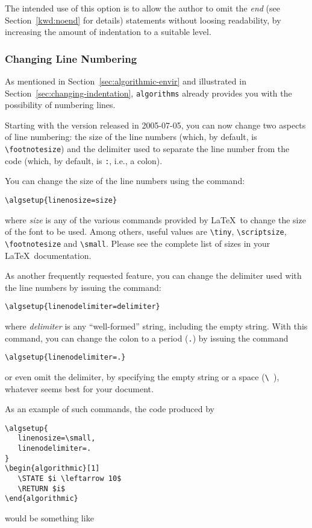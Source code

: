 \documentclass[letterpaper]{article}
\newcommand{\keyword}[1]{\texttt{#1}}
\begin{document}
The intended use of this option is to allow the author to omit the
\emph{end} (see Section~\ref{kwd:noend} for details) statements without
loosing readability, by increasing the amount of indentation to a
suitable level.

\subsubsection{Changing Line Numbering}

As mentioned in Section~\ref{sec:algorithmic-envir} and illustrated in
Section~\ref{sec:changing-indentation}, \keyword{algorithms} already
provides you with the possibility of numbering lines.

Starting with the version released in 2005-07-05, you can now change two
aspects of line numbering: the size of the line numbers (which, by
default, is \verb+\footnotesize+) and the delimiter used to separate the
line number from the code (which, by default, is \verb+:+, i.e., a
colon).

You can change the size of the line numbers using the command:
\begin{verbatim}
\algsetup{linenosize=size}
\end{verbatim}
where \emph{size} is any of the various commands provided by \LaTeX\ to
change the size of the font to be used. Among others, useful values are
\verb+\tiny+, \verb+\scriptsize+, \verb+\footnotesize+ and
\verb+\small+.  Please see the complete list of sizes in your \LaTeX\
documentation.

As another frequently requested feature, you can change the delimiter
used with the line numbers by issuing the command:
\begin{verbatim}
\algsetup{linenodelimiter=delimiter}
\end{verbatim}
where \emph{delimiter} is any ``well-formed'' string, including the
empty string. With this command, you can change the colon to a period
(\verb+.+) by issuing the command
\begin{verbatim}
\algsetup{linenodelimiter=.}
\end{verbatim}
or even omit the delimiter, by specifying the empty string or a space
(\verb+\ +), whatever seems best for your document.

As an example of such commands, the code produced by
\begin{verbatim}
\algsetup{
   linenosize=\small,
   linenodelimiter=.
}
\begin{algorithmic}[1]
   \STATE $i \leftarrow 10$
   \RETURN $i$ 
\end{algorithmic}
\end{verbatim}
would be something like
\end{document}
